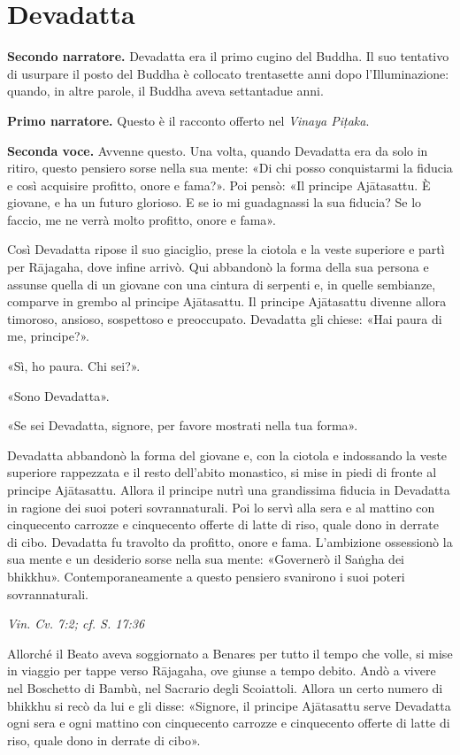\chapter{Devadatta}

\textbf{Secondo narratore.} Devadatta era il primo cugino del Buddha. Il suo
tentativo di usurpare il posto del Buddha è collocato trentasette anni
dopo l’Illuminazione: quando, in altre parole, il Buddha aveva
settantadue anni.


\textbf{Primo narratore.} Questo è il racconto offerto nel \emph{Vinaya Piṭaka}.


\textbf{Seconda voce.} Avvenne questo. Una volta, quando Devadatta era da solo in
ritiro, questo pensiero sorse nella sua mente: «Di chi posso
conquistarmi la fiducia e così acquisire profitto, onore e fama?». Poi
pensò: «Il principe Ajātasattu. È giovane, e ha un futuro glorioso. E se
io mi guadagnassi la sua fiducia? Se lo faccio, me ne verrà molto
profitto, onore e fama».


Così Devadatta ripose il suo giaciglio, prese la ciotola e la veste
superiore e partì per Rājagaha, dove infine arrivò. Qui abbandonò la
forma della sua persona e assunse quella di un giovane con una cintura
di serpenti e, in quelle sembianze, comparve in grembo al principe
Ajātasattu. Il principe Ajātasattu divenne allora timoroso, ansioso,
sospettoso e preoccupato. Devadatta gli chiese: «Hai paura di me,
principe?».


«Sì, ho paura. Chi sei?».


«Sono Devadatta».


«Se sei Devadatta, signore, per favore mostrati nella tua forma».


Devadatta abbandonò la forma del giovane e, con la ciotola e indossando
la veste superiore rappezzata e il resto dell’abito monastico, si mise
in piedi di fronte al principe Ajātasattu. Allora il principe nutrì una
grandissima fiducia in Devadatta in ragione dei suoi poteri
sovrannaturali. Poi lo servì alla sera e al mattino con cinquecento
carrozze e cinquecento offerte di latte di riso, quale dono in derrate
di cibo. Devadatta fu travolto da profitto, onore e fama. L’ambizione
ossessionò la sua mente e un desiderio sorse nella sua mente: «Governerò
il Saṅgha dei bhikkhu». Contemporaneamente a questo pensiero svanirono i
suoi poteri sovrannaturali.


\emph{Vin. Cv. 7:2; cf. S. 17:36}


Allorché il Beato aveva soggiornato a Benares per tutto il tempo che
volle, si mise in viaggio per tappe verso Rājagaha, ove giunse a tempo
debito. Andò a vivere nel Boschetto di Bambù, nel Sacrario degli
Scoiattoli. Allora un certo numero di bhikkhu si recò da lui e gli
disse: «Signore, il principe Ajātasattu serve Devadatta ogni sera e ogni
mattino con cinquecento carrozze e cinquecento offerte di latte di riso,
quale dono in derrate di cibo».


